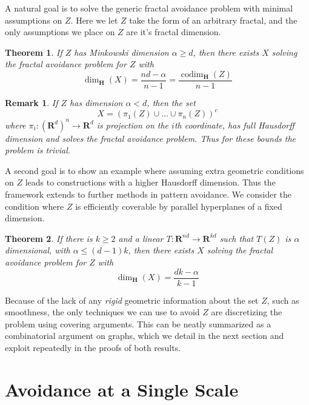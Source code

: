 \documentclass{article}
\theoremstyle{plain}
\theoremstyle{plain}
\newtheorem{theorem}{Theorem}
\newtheorem*{remark}{Remark}
\DeclareMathOperator{\codim}{codim}
\begin{document}
\begin{multicols}{2}
A natural goal is to solve the generic fractal avoidance problem with minimal assumptions on $Z$. Here we let $Z$ take the form of an arbitrary fractal, and the only assumptions we place on $Z$ are it's fractal dimension.

\begin{theorem}
	If $Z$ has Minkowski dimension $\alpha \geq d$, then there exists $X$ solving the fractal avoidance problem for $Z$ with
	\[ \dim_{\mathbf{H}}(X) = \frac{nd - \alpha}{n - 1} = \frac{\codim_{\mathbf{H}}(Z)}{n - 1} \]
\end{theorem}

\begin{remark}
	If $Z$ has dimension $\alpha < d$, then the set
	\[ X = (\pi_1(Z) \cup \dots \cup \pi_n(Z))^c \]
	where $\pi_i: (\mathbf{R}^d)^n \to \mathbf{R}^d$ is projection on the $i$th coordinate, has full Hausdorff dimension and solves the fractal avoidance problem. Thus for these bounds the problem is trivial.
\end{remark}


A second goal is to show an example where assuming extra geometric conditions on $Z$ leads to constructions with a higher Hausdorff dimension. Thus the framework extends to further methods in pattern avoidance. We consider the condition where $Z$ is efficiently coverable by parallel hyperplanes of a fixed dimension.

\begin{theorem}
	If there is $k \geq 2$ and a linear $T: \mathbf{R}^{nd} \to \mathbf{R}^{kd}$ such that $T(Z)$ is $\alpha$ dimensional, with $\alpha \leq (d-1)k$, then there exists $X$ solving the fractal avoidance problem for $Z$ with
	\[ \dim_{\mathbf{H}}(X) = \frac{dk - \alpha}{k-1} \]
\end{theorem}

Because of the lack of any {\it rigid} geometric information about the set $Z$, such as smoothness, the only techniques we can use to avoid $Z$ are discretizing the problem using covering arguments. This can be neatly summarized as a combinatorial argument on graphs, which we detail in the next section and exploit repeatedly in the proofs of both results.

\section{Avoidance at a Single Scale}


\end{multicols}
\end{document}
